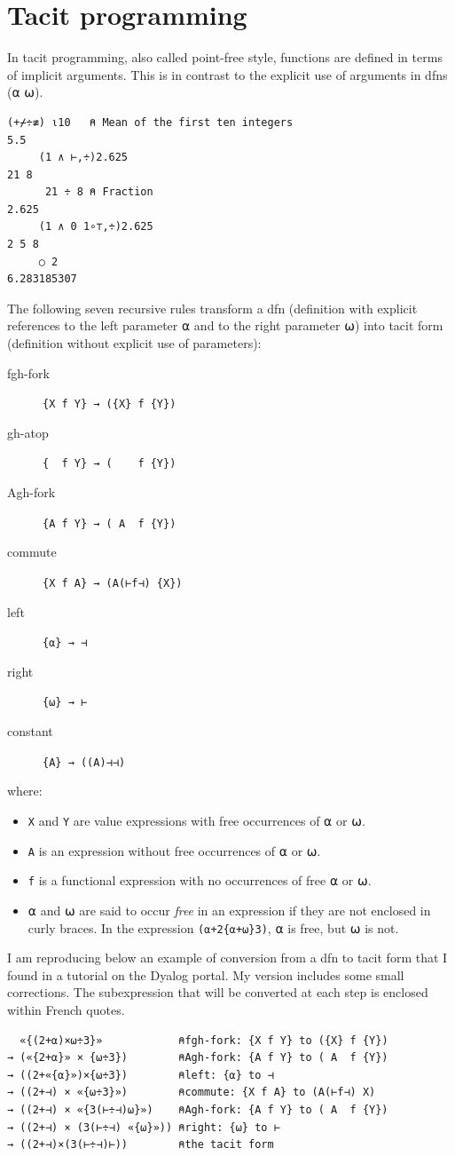 \documentclass[a4paper,12pt]{book}
\begin{document}
\section{Tacit programming}
In tacit programming, also called
point-free style, functions are defined
in terms of implicit arguments. This is in
contrast to the explicit use of arguments
in dfns (⍺ ⍵).

\begin{lstlisting}[language=apl]
      (+⌿÷≢) ⍳10   ⍝ Mean of the first ten integers
5.5
     (1 ∧ ⊢,÷)2.625
21 8
      21 ÷ 8 ⍝ Fraction
2.625
     (1 ∧ 0 1∘⊤,÷)2.625
2 5 8
     ○ 2
6.283185307
\end{lstlisting}


The following seven recursive rules
transform a dfn (definition with explicit
references to the left parameter ⍺ and
to the right parameter ⍵) into tacit
form (definition without explicit use of parameters):

\begin{description}
\item[fgh-fork] \verb|{X f Y} → ({X} f {Y})|
\item[gh-atop] \verb|{  f Y} → (    f {Y})|
\item[Agh-fork] \verb|{A f Y} → ( A  f {Y})|
\item[commute] \verb|{X f A} → (A(⊢f⊣) {X})|
\item[left] \verb|{⍺} → ⊣|
\item[right] \verb|{⍵} → ⊢|
\item[constant] \verb|{A} → ((A)⊣⊣)|
\end{description}
where:
\begin{itemize}
  \item \verb|X| and \verb|Y| are value expressions
  with free occurrences of ⍺ or ⍵.

  \item \verb|A| is an expression
  without free occurrences of ⍺ or ⍵.

  \item \verb|f| is a functional expression
  with no occurrences of free ⍺ or ⍵.

  \item ⍺ and ⍵ are said to occur \emph{free}
  in an expression if they are not enclosed
  in curly braces. In the expression
  \verb|(⍺+2{⍺+⍵}3)|, ⍺ is free, but ⍵ is not.
\end{itemize}

I am reproducing below an example of conversion
from a dfn to tacit form that I found in a tutorial
on the Dyalog portal. My version includes some
small corrections. The subexpression that will
be converted at each step is enclosed within French quotes.
\begin{verbatim}
  «{(2+⍺)×⍵÷3}»            ⍝fgh-fork: {X f Y} to ({X} f {Y})
→ («{2+⍺}» × {⍵÷3})        ⍝Agh-fork: {A f Y} to ( A  f {Y})
→ ((2+«{⍺}»)×{⍵÷3})        ⍝left: {⍺} to ⊣
→ ((2+⊣) × «{⍵÷3}»)        ⍝commute: {X f A} to (A(⊢f⊣) X)
→ ((2+⊣) × «{3(⊢÷⊣)⍵}»)    ⍝Agh-fork: {A f Y} to ( A  f {Y})
→ ((2+⊣) × (3(⊢÷⊣) «{⍵}»)) ⍝right: {⍵} to ⊢
→ ((2+⊣)×(3(⊢÷⊣)⊢))        ⍝the tacit form
\end{verbatim}
\label{dfn-to-tacit}
\end{document}
